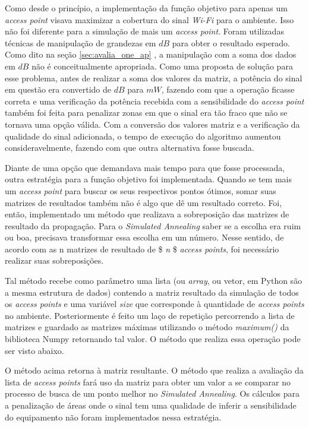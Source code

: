 \documentclass[
	12pt,				%
	twoside,			%
	a4paper,			%
	english,			%
	french,				%
	spanish,			%
	brazil				%
	]{abntex2}
\begin{document}
Como desde o princípio, a implementação da função objetivo para apenas
um \emph{access point} visava maximizar a cobertura do sinal
\emph{Wi-Fi} para o ambiente. Isso não foi diferente para a simulação de
mais um \emph{access point}. Foram utilizadas técnicas de manipulação de
grandezas em \(dB\) para obter o resultado esperado. Como dito na seção
\ref{sec:avalia_one_ap} , a manipulação com a soma dos dados em \(dB\)
não é conceitualmente apropriada. Como uma proposta de solução para esse
problema, antes de realizar a soma dos valores da matriz, a potência do
sinal em questão era convertido de \(dB\) para \(mW\), fazendo com que a
operação ficasse correta e uma verificação da potência recebida com a
sensibilidade do \emph{access point} também foi feita para penalizar
zonas em que o sinal era tão fraco que não se tornava uma opção válida.
Com a conversão dos valores matriz e a verificação da qualidade do sinal
adicionada, o tempo de execução do algoritmo aumentou consideravelmente,
fazendo com que outra alternativa fosse buscada.

Diante de uma opção que demandava mais tempo para que fosse processada,
outra estratégia para a função objetivo foi implementada. Quando se tem
mais um \emph{access point} para buscar os seus respectivos pontos
ótimos, somar suas matrizes de resultados também não é algo que dê um
resultado correto. Foi, então, implementado um método que realizava a
sobreposição das matrizes de resultado da propagação. Para o
\emph{Simulated Annealing} saber se a escolha era ruim ou boa, precisava
transformar essa escolha em um número. Nesse sentido, de acordo com as n
matrizes de resultado de \$ \textit{n} \$ \emph{access points}, foi
necessário realizar suas sobreposições.

Tal método recebe como parâmetro uma lista (ou \emph{array}, ou vetor,
em Python são a mesma estrutura de dados) contendo a matriz resultado da
simulação de todos os \emph{access points} e uma variável \emph{size}
que corresponde à quantidade de \emph{access points} no ambiente.
Posteriormente é feito um laço de repetição percorrendo a lista de
matrizes e guardado as matrizes máximas utilizando o método
\emph{maximum()} da biblioteca Numpy retornando tal valor. O método que
realiza essa operação pode ser visto abaixo.



O método acima retorna à matriz resultante. O método que realiza a
avaliação da lista de \emph{access points} fará uso da matriz para obter
um valor a se comparar no processo de busca de um ponto melhor no
\emph{Simulated Annealing}. Os cálculos para a penalização de áreas onde
o sinal tem uma qualidade de inferir a sensibilidade do equipamento não
foram implementados nessa estratégia.
\end{document}
